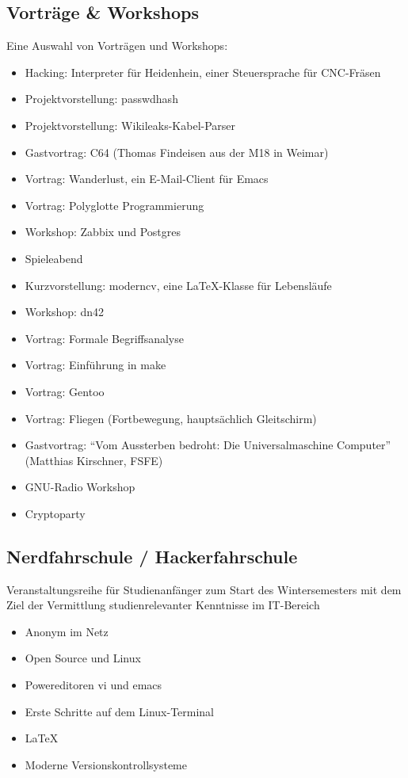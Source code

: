 \documentclass[10pt, a4paper]{scrartcl}
\begin{document}
\subsection*{Vorträge \& Workshops}
Eine Auswahl von Vorträgen und Workshops:
\begin{itemize}
	\item Hacking: Interpreter für Heidenhein, einer Steuersprache für CNC-Fräsen
	\item Projektvorstellung: passwdhash
	\item Projektvorstellung: Wikileaks-Kabel-Parser
	\item Gastvortrag: C64 (Thomas Findeisen aus der M18 in Weimar)
	\item Vortrag: Wanderlust, ein E-Mail-Client für Emacs
	\item Vortrag: Polyglotte Programmierung
	\item Workshop: Zabbix und Postgres
	\item Spieleabend
	\item Kurzvorstellung: moderncv, eine \LaTeX-Klasse für Lebensläufe
	\item Workshop: dn42
	\item Vortrag: Formale Begriffsanalyse
	\item Vortrag: Einführung in make
	\item Vortrag: Gentoo
	\item Vortrag: Fliegen (Fortbewegung, hauptsächlich Gleitschirm)
	\item Gastvortrag: "`Vom Aussterben bedroht: Die Universalmaschine Computer"'
		(Matthias Kirschner, FSFE)
	\item GNU-Radio Workshop
	\item Cryptoparty
\end{itemize}

\subsection*{Nerdfahrschule / Hackerfahrschule}
Veranstaltungsreihe für Studienanfänger zum Start des Wintersemesters
mit dem Ziel der Vermittlung studienrelevanter Kenntnisse im IT-Bereich
\begin{itemize}
	\item Anonym im Netz
	\item Open Source und Linux
	\item Powereditoren vi und emacs
	\item Erste Schritte auf dem Linux-Terminal
	\item \LaTeX
	\item Moderne Versionskontrollsysteme
\end{itemize}
\end{document}
